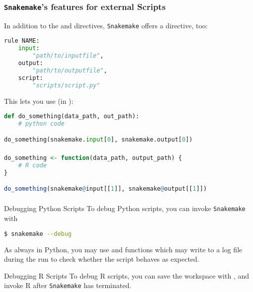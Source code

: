 \begingroup
{}
\begin{frame}[fragile]
  \frametitle{\texttt{Snakemake}'s features for external Scripts}
  In addition to the  and  directives, \texttt{Snakemake} offers a  directive, too:
  \begin{lstlisting}[language=Python,style=Python]
rule NAME:
    input:
        "path/to/inputfile",
    output:
        "path/to/outputfile",
    script:
        "scripts/script.py"
  \end{lstlisting}
  This lets you use (in ):
  \begin{lstlisting}[language=Python,style=Python]
def do_something(data_path, out_path):
    # python code

do_something(snakemake.input[0], snakemake.output[0])
  \end{lstlisting}
\end{frame}
\endgroup

\begin{frame}[fragile]
  \frametitle{}
  \begin{lstlisting}[language=R,style=R]
do_something <- function(data_path, output_path) {
    # R code
}

do_something(snakemake@input[[1]], snakemake@output[[1]])
  \end{lstlisting}
\end{frame}

\begin{frame}[fragile]
  \frametitle{}
  \begin{exampleblock}{Debugging Python Scripts}
  To debug Python scripts, you can invoke \texttt{Snakemake} with
  \begin{lstlisting}[language=Bash, style=Shell]
$ snakemake --debug
  \end{lstlisting}
  As always in Python, you may use  and  functions which may write to a log file during the run to check whether the script behaves as expected.
  \end{exampleblock}
  \pause
  \begin{exampleblock}{Debugging R Scripts}
  To debug R scripts, you can save the workspace with , and invoke R after \texttt{Snakemake} has terminated. 
  \end{exampleblock}
\end{frame}


